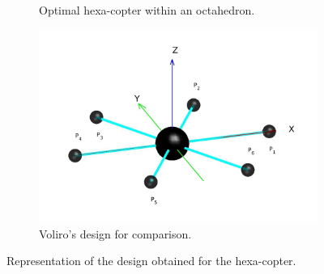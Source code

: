 {\begin{figure}[!ht]
{\begin{subfigure}[b]{0.55\textwidth}
    \caption{Optimal hexa-copter within an octahedron.} \label{fig:Hexacopter_resultb}
  \end{subfigure}
  \hspace*{\fill} %
  \begin{subfigure}[b]{0.8\textwidth}
    \includegraphics[width=\linewidth]{images/Voliro.jpg}
    \caption{Voliro's design for comparison.} \label{fig:Hexacopter_resultc}
  \end{subfigure}}
  \caption{Representation of the design obtained for the hexa-copter.}
  \label{fig:Hexacopter_result}
\end{figure}

}
